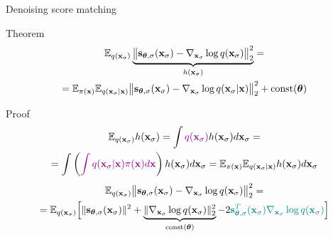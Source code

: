 \begin{frame}{Denoising score matching}
	\begin{block}{Theorem}
	\vspace{-0.5cm}
	\begin{multline*}
		\mathbb{E}_{q(\mathbf{x}_{\sigma})}\underbrace{\bigl\| \mathbf{s}_{\boldsymbol{\theta}, \sigma}(\mathbf{x}_{\sigma}) - \nabla_{\mathbf{x}_{\sigma}} \log q(\mathbf{x}_{\sigma}) \bigr\|^2_2}_{h(\mathbf{x}_{\sigma})} = \\
		= \mathbb{E}_{\pi(\mathbf{x})} \mathbb{E}_{q(\mathbf{x}_{\sigma} | \mathbf{x})}\bigl\| \mathbf{s}_{\boldsymbol{\theta}, \sigma}(\mathbf{x}_{\sigma}) - \nabla_{\mathbf{x}_{\sigma}} \log q(\mathbf{x}_{\sigma} | \mathbf{x}) \bigr\|^2_2 + \text{const}(\boldsymbol{\theta})
	\end{multline*}
	\vspace{-0.5cm}
	\end{block}
	\begin{block}{Proof}
		\vspace{-0.7cm}
		\begin{multline*}
			\mathbb{E}_{q(\mathbf{x}_{\sigma})} h(\mathbf{x}_{\sigma}) = \int {\color{violet}q(\mathbf{x}_{\sigma})} h(\mathbf{x}_{\sigma}) d\mathbf{x}_{\sigma} = \\
			= \int \left({\color{violet}\int q(\mathbf{x}_{\sigma} | \mathbf{x}) \pi(\mathbf{x}) d\mathbf{x}}\right) h(\mathbf{x}_{\sigma}) d\mathbf{x}_{\sigma} =  \mathbb{E}_{\pi(\mathbf{x})} \mathbb{E}_{q(\mathbf{x}_{\sigma} | \mathbf{x})}  h(\mathbf{x}_{\sigma}) d\mathbf{x}_{\sigma}
		\end{multline*}
		\vspace{-0.7cm}
		{\small
		\begin{multline*}
			\mathbb{E}_{q(\mathbf{x}_{\sigma})}\bigl\| \mathbf{s}_{\boldsymbol{\theta}, \sigma}(\mathbf{x}_{\sigma}) - \nabla_{\mathbf{x}_{\sigma}} \log q(\mathbf{x}_{\sigma}) \bigr\|^2_2 = \\ 
			= \mathbb{E}_{q(\mathbf{x}_{\sigma})} \Bigl[\| \mathbf{s}_{\boldsymbol{\theta}, \sigma}(\mathbf{x}_{\sigma}) \|^2 + \underbrace{\| \nabla_{\mathbf{x}_{\sigma}} \log q(\mathbf{x}_{\sigma}) \|^2_2}_{\text{const}(\boldsymbol{\theta})} - 2 {\color{teal}\mathbf{s}_{\boldsymbol{\theta}, \sigma}^T(\mathbf{x}_{\sigma}) \nabla_{\mathbf{x}_{\sigma}} \log q(\mathbf{x}_{\sigma})} \Bigr]
		\end{multline*}
		}
	\end{block}
\end{frame}
